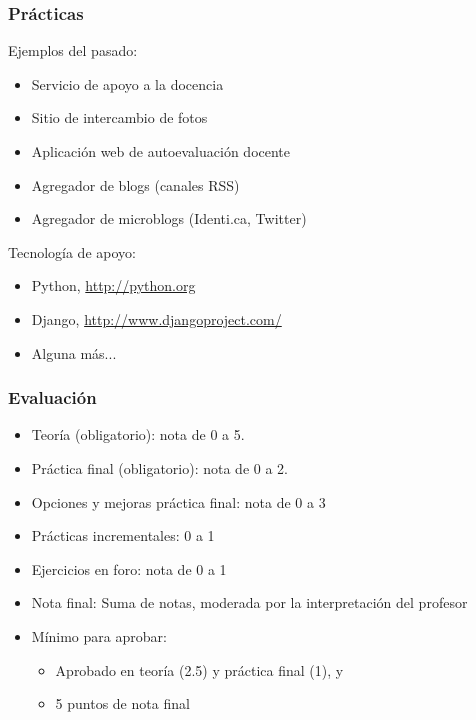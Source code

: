 \begin{frame}
\frametitle{Prácticas}

Ejemplos del pasado:

\begin{itemize}
\item Servicio de apoyo a la docencia
\item Sitio de intercambio de fotos
\item Aplicación web de autoevaluación docente
\item Agregador de blogs (canales RSS)
\item Agregador de microblogs (Identi.ca, Twitter)
\end{itemize}

Tecnología de apoyo:

\begin{itemize}
\item Python, \url{http://python.org}
\item Django, \url{http://www.djangoproject.com/}
\item Alguna más...
\end{itemize}

\end{frame}


\begin{frame}
\frametitle{Evaluación}

\begin{itemize}
\item Teoría (obligatorio): nota de 0 a 5.
\item Práctica final (obligatorio): nota de 0 a 2.
\item Opciones y mejoras práctica final: nota de 0 a 3
\item Prácticas incrementales: 0 a 1
\item Ejercicios en foro: nota de 0 a 1
\item Nota final: Suma de notas, moderada por la interpretación del profesor
\item Mínimo para aprobar:
      \begin{itemize}
      \item Aprobado en teoría (2.5) y práctica final (1), y
      \item 5 puntos de nota final
      \end{itemize}
\end{itemize}

\end{frame}

